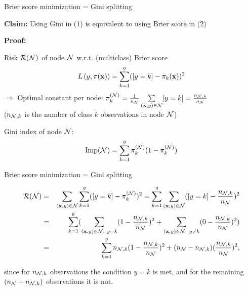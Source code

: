 \documentclass[11pt,compress,t,notes=noshow, xcolor=table]{beamer}
\begin{document}
\begin{frame}{Brier score minimization = Gini splitting}

\textbf{Claim:} Using Gini in (1) 
    is equivalent to using Brier score in (2) %
    

\textbf{Proof:} %

Risk $\mathcal{R}(\mathcal{N})$ of node $\mathcal{N}$ w.r.t. (multiclass) Brier score
$$
  L\left(y, \pi(\mathbf{x})\right) = \sum_{k = 1}^g ([y = k] - \pi_k(\mathbf{x}))^2
$$
$\Rightarrow$ Optimal constant per node: $\pi_k^{(\mathcal{N})} = \frac{1}{n_{\mathcal{N}}} \sum\limits_{(\mathbf{x},y) \in \mathcal{N}} [y = k] = \frac{n_{\mathcal{N},k}}{n_{\mathcal{N} }}$ \\ ($n_{\mathcal{N},k}$ is the number of class $k$ observations in node $\mathcal{N}$) \\

\vfill

Gini index of node $\mathcal{N}$:
$$
\text{Imp}(\Np) = \sum_{k=1}^g \pikN (1-\pikN ) %
$$


\end{frame}
\begin{frame2}[footnotesize]{Brier score minimization = Gini splitting}

\begin{eqnarray*}
\mathcal{R}(\mathcal{N}) &=& \sum_{(\mathbf{x}, y) \in \mathcal{N}}  \sum_{k = 1}^g ([y = k] - \pi_k^{(\mathcal{N})})^2 
= \sum_{k = 1}^g \sum_{(\mathbf{x}, y) \in \mathcal{N}} ([y = k] - \frac{n_{\mathcal{N},k}}{n_{\mathcal{N} }})^2\\
&=& \sum_{k = 1}^{g} (\sum_{(\mathbf{x}, y) \in \mathcal{N}: ~ y = k} (1 - \frac{n_{\mathcal{N},k}}{n_{\mathcal{N} }})^2 + \sum_{(\mathbf{x}, y) \in \mathcal{N}: ~ y \ne k} (0 - \frac{n_{\mathcal{N},k}}{n_{\mathcal{N} }})^2) \\
&=& \sum_{k = 1}^g n_{\mathcal{N},k}(1 - \frac{n_{\mathcal{N},k}}{n_{\mathcal{N} }})^2 + (n_{\mathcal{N} } - n_{\mathcal{N},k})(\frac{n_{\mathcal{N},k}}{n_{\mathcal{N} }})^2, 
\end{eqnarray*}

since for $n_{\mathcal{N},k}$ observations the condition $y = k$ is met, and for the remaining $(n_{\mathcal{N}} - n_{\mathcal{N},k})$ observations it is not. 

\end{frame2}
\end{document}
